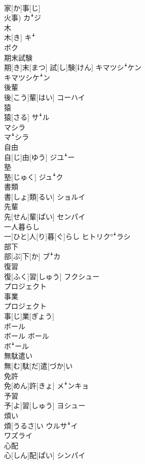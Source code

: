 \documentclass[8pt]{extreport}
\begin{document}
\begin{CJK}{UTF8}{min}
\\	家[か]事[じ] 
\\	火事)	カꜜジ
\\	木	
\\	木[き]	キꜜ 
\\	ボク
\\	期末試験	
\\	期[き]末[まつ] 試[し]験[けん]	キマツシꜜケン 
\\	キマツシケꜜン
\\	後輩	
\\	後[こう]輩[はい]	コーハイ
\\	猿	
\\	猿[さる]	サꜜル 
\\	マシラ 
\\	マꜜシラ
\\	自由	
\\	自[じ]由[ゆう]	ジユꜜー
\\	塾	
\\	塾[じゅく]	ジュꜜク
\\	書類	
\\	書[しょ]類[るい]	ショルイ
\\	先輩	
\\	先[せん]輩[ぱい]	センパイ
\\	一人暮らし	
\\	一[ひと]人[り]暮[ぐ]らし	ヒトリク°ꜜラシ
\\	部下	
\\	部[ぶ]下[か]	ブꜜカ
\\	復習	
\\	復[ふく]習[しゅう]	フクシュー
\\	プロジェクト 
\\	事業	
\\	プロジェクト 
\\	事[じ]業[ぎょう]	
\\	ボール	
\\	ボール	ボール 
\\	ボꜜール
\\	無駄遣い	
\\	無[む]駄[だ]遣[づか]い	
\\	免許	
\\	免[めん]許[きょ]	メꜜンキョ
\\	予習	
\\	予[よ]習[しゅう]	ヨシュー
\\	煩い	
\\	煩[うるさ]い	ウルサꜜイ 
\\	ワズライ
\\	心配	
\\	心[しん]配[ぱい]	シンパイ

\end{CJK}
\end{document}
